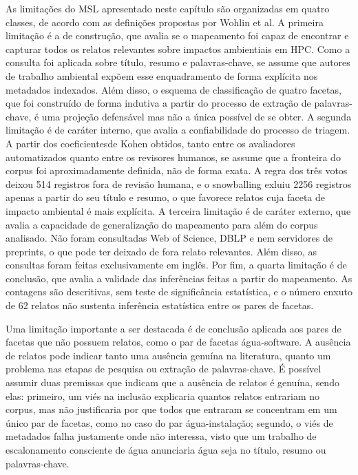 As limitações do MSL apresentado neste capítulo são organizadas em quatro classes, de acordo com as definições
propostas por Wohlin et al. A primeira limitação é a de construção, que avalia se o mapeamento foi capaz de encontrar
e capturar todos os relatos relevantes sobre impactos ambientiais em HPC. Como a consulta foi aplicada sobre título,
resumo e palavras-chave, se assume que autores de trabalho ambiental expõem esse enquadramento de forma 
explícita nos metadados indexados. Além disso, o esquema de classificação de quatro facetas, que foi construído
de forma indutiva a partir do processo de extração de palavras-chave, é uma projeção defensável mas não a 
única possível de se obter. A segunda limitação é de caráter interno, que avalia a confiabilidade do processo de triagem.
A partir dos coeficientesde Kohen obtidos, tanto entre os avaliadores automatizados quanto entre os revisores humanos,
se assume que a fronteira do corpus foi aproximadamente definida, não de forma exata. A regra dos três votos
deixou 514 registros fora de revisão humana, e o snowballing exluiu 2256 registros apenas a partir do seu título e
resumo, o que favorece relatos cuja faceta de impacto ambiental é mais explícita. A terceira limitação é de caráter
externo, que avalia a capacidade de generalização do mapeamento para além do corpus analisado. Não foram consultadas
Web of Science, DBLP e nem servidores de preprints, o que pode ter deixado de fora relato relevantes. Além disso,
as consultas foram feitas exclusivamente em inglês. Por fim, a quarta limitação é de conclusão, que avalia a
validade das inferências feitas a partir do mapeamento. As contagens são descritivas, sem teste de significância
estatística, e o número enxuto de 62 relatos não sustenta inferência estatística entre os pares de facetas.

Uma limitação importante a ser destacada é de conclusão aplicada aos pares de facetas que não possuem relatos,
como o par de facetas água-software. A ausência de relatos pode indicar tanto uma ausência genuína na literatura,
quanto um problema nas etapas de pesquisa ou extração de palavras-chave. É possível assumir duas premissas que
indicam que a ausência de relatos é genuína, sendo elas: primeiro, um viés na inclusão explicaria quantos relatos
entrariam no corpus, mas não justificaria por que todos que entraram se concentram em um único par de facetas,
como no caso do par água-instalação; segundo, o viés de metadados falha justamente onde não interessa, visto que
um trabalho de escalonamento consciente de água anunciaria água seja no título, resumo ou palavras-chave.

